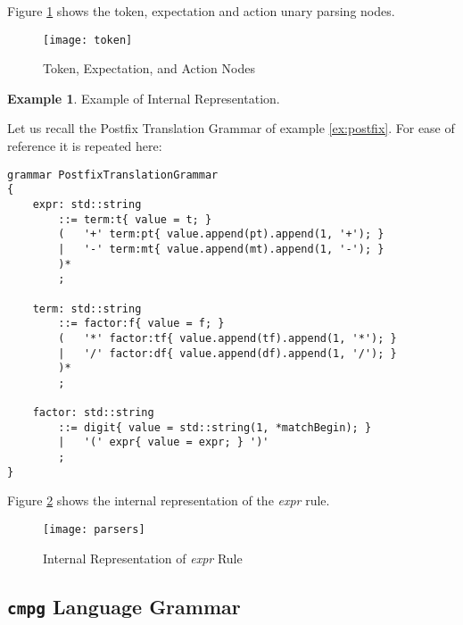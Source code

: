\documentclass[a4paper,oneside,11pt]{book}
\theoremstyle{definition}
\newtheorem{exmp}{Example}[section]
\begin{document}
Figure \ref{fig:token} shows the token, expectation and action unary parsing nodes.

\begin{figure}[htb]
\caption{Token, Expectation, and Action Nodes}
\label{fig:token}
\vspace{0.5cm}
\begin{center}
\texttt{[image: token]}
\end{center}
\end{figure}

\clearpage
\begin{exmp} Example of Internal Representation.
\begin{flushleft}
Let us recall the Postfix Translation Grammar of example \ref{ex:postfix}. For ease of reference it is repeated here:

\lstset{language=cmpg}
\begin{lstlisting}
grammar PostfixTranslationGrammar
{
    expr: std::string
        ::= term:t{ value = t; }
        (   '+' term:pt{ value.append(pt).append(1, '+'); }
        |   '-' term:mt{ value.append(mt).append(1, '-'); }
        )*
        ;

    term: std::string
        ::= factor:f{ value = f; }
        (   '*' factor:tf{ value.append(tf).append(1, '*'); }
        |   '/' factor:df{ value.append(df).append(1, '/'); }
        )*
        ;

    factor: std::string
        ::= digit{ value = std::string(1, *matchBegin); }
        |   '(' expr{ value = expr; } ')'
        ;
}
\end{lstlisting}

Figure \ref{fig:parsers} shows the internal representation of the \emph{expr} rule.

\begin{figure}[htb]
\caption{Internal Representation of \emph{expr} Rule}
\label{fig:parsers}
\begin{center}
\texttt{[image: parsers]}
\end{center}
\end{figure}
\end{flushleft}
\end{exmp}

\clearpage
\subsection{\texttt{cmpg} Language Grammar}
\end{document}
